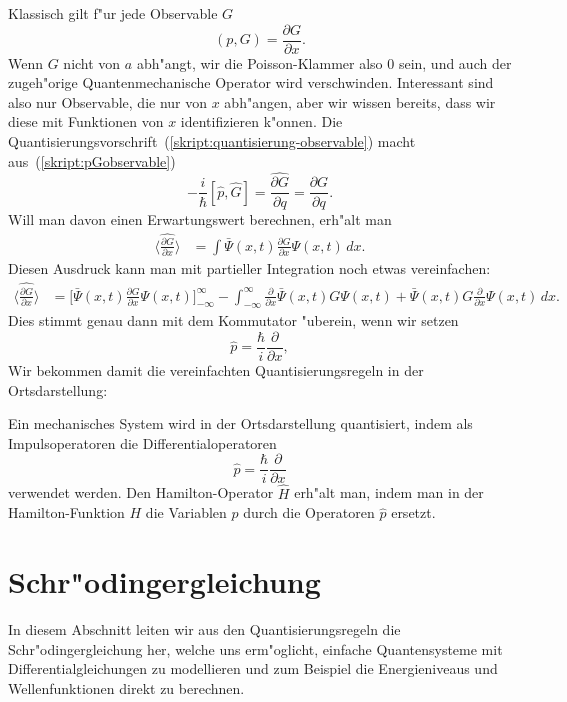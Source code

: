 Klassisch gilt f"ur jede Observable $G$
\begin{equation}
(p,G)=\frac{\partial G}{\partial x}.
\label{skript:pGobservable}
\end{equation}
Wenn $G$ nicht von $a$ abh"angt, wir die Poisson-Klammer also $0$ sein,
und auch der zugeh"orige Quantenmechanische Operator wird verschwinden.
Interessant sind also nur Observable, die nur von $x$ abh"angen,
aber wir wissen bereits, dass wir diese mit Funktionen von $x$
identifizieren k"onnen.
Die Quantisierungsvorschrift~(\ref{skript:quantisierung-observable})
macht aus~(\ref{skript:pGobservable})
\[
-\frac{i}{\hbar}[\hat p,\hat G]
=
\widehat{\frac{\partial G}{\partial q}}
=
\frac{\partial G}{\partial q}.
\]
Will man davon einen Erwartungswert berechnen, erh"alt man
\begin{align*}
\biggl\langle
\widehat{\frac{\partial G}{\partial x}}
\biggr\rangle
&=\int \bar\Psi(x,t)\frac{\partial G}{\partial x}\Psi(x,t)\,dx.
\end{align*}
Diesen Ausdruck kann man mit partieller Integration noch etwas
vereinfachen:
\begin{align*}
\biggl\langle
\widehat{\frac{\partial G}{\partial x}}
\biggr\rangle
&=
\biggl[
\bar\Psi(x,t)\frac{\partial G}{\partial x}\Psi(x,t)
\biggr]_{-\infty}^\infty
-
\int_{-\infty}^{\infty}
\frac{\partial}{\partial x}
\bar\Psi(x,t) G
\Psi(x,t)
+
\bar\Psi(x,t) G
\frac{\partial}{\partial x}
\Psi(x,t)
\,dx.
\end{align*}
Dies stimmt genau dann mit dem Kommutator "uberein, wenn wir setzen
\[
\hat p = \frac{\hbar}{i}\frac{\partial}{\partial x},
\]
Wir bekommen damit die vereinfachten Quantisierungsregeln in der
Ortsdarstellung:
\begin{satz}
\label{skript:quantisierungsregeln-ortsdarstellung}
Ein mechanisches System wird in der Ortsdarstellung quantisiert,
indem als Impulsoperatoren die Differentialoperatoren
\[
\hat p=\frac{\hbar}{i}\frac{\partial}{\partial x}
\]
verwendet werden. Den Hamilton-Operator $\hat H$ erh"alt man, indem man
in der Hamilton-Funktion $H$ die Variablen $p$ durch die Operatoren 
$\hat p$ ersetzt.
\end{satz}

\section{Schr"odingergleichung}
In diesem Abschnitt leiten wir aus den Quantisierungsregeln die
Schr"odingergleichung her, welche uns erm"oglicht, einfache
Quantensysteme mit Differentialgleichungen zu modellieren
und zum Beispiel die Energieniveaus und Wellenfunktionen direkt
zu berechnen.

